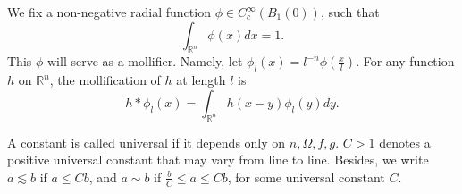 \documentclass[reqno,12pt]{amsart}
\numberwithin{equation}{section}
\theoremstyle{plain}
\theoremstyle{definition}
\newcommand{\R}{\mathbb{R}}
\begin{document}
We fix a non-negative radial function $\phi\in C^\infty_c(B_1(0))$, such that 
\begin{equation*}
\int_{\R^n}\phi(x)dx=1.
\end{equation*}
This $\phi$ will serve as a mollifier. Namely, let $\phi_l(x)=l^{-n}\phi(\frac{x}{l})$. For any function $h$ on $\R^n$, the mollification of $h$ at length $l$ is 
\begin{equation*}
h*\phi_l(x)=\int_{\R^n} h(x-y)\phi_l(y)dy.
\end{equation*}

A constant is called universal if it depends only on $n,\Omega,f,g$. $C>1$ denotes a positive universal constant that may vary from line to line. Besides, we write $a\lesssim b$ if $a\le Cb$, and $a\sim b$ if $\frac{b}{C}\le a\le Cb$, for some universal constant $C$. 
\end{document}
